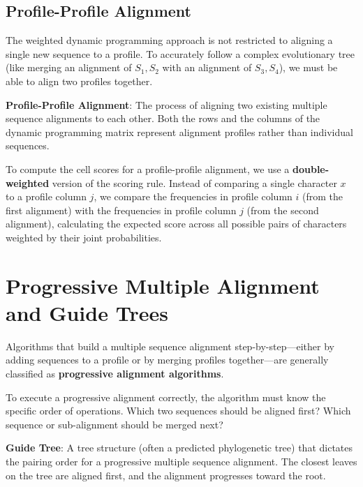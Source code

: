 \documentclass[11pt, a4paper]{article}
\newenvironment{important}
  {\begin{tcolorbox}[colback=blue!5!white, colframe=blue!75!black, arc=1mm, boxrule=1pt]}
  {\end{tcolorbox}}
\begin{document}
\subsection{Profile-Profile Alignment}

The weighted dynamic programming approach is not restricted to aligning a single new sequence to a profile. To accurately follow a complex evolutionary tree (like merging an alignment of $S_1, S_2$ with an alignment of $S_3, S_4$), we must be able to align two profiles together.

\begin{important}
  \textbf{Profile-Profile Alignment}: The process of aligning two existing multiple sequence alignments to each other. Both the rows and the columns of the dynamic programming matrix represent alignment profiles rather than individual sequences.
\end{important}

To compute the cell scores for a profile-profile alignment, we use a \textbf{double-weighted} version of the scoring rule. Instead of comparing a single character $x$ to a profile column $j$, we compare the frequencies in profile column $i$ (from the first alignment) with the frequencies in profile column $j$ (from the second alignment), calculating the expected score across all possible pairs of characters weighted by their joint probabilities.

\section{Progressive Multiple Alignment and Guide Trees}

Algorithms that build a multiple sequence alignment step-by-step—either by adding sequences to a profile or by merging profiles together—are generally classified as \textbf{progressive alignment algorithms}. 

To execute a progressive alignment correctly, the algorithm must know the specific order of operations. Which two sequences should be aligned first? Which sequence or sub-alignment should be merged next?

\begin{important}
  \textbf{Guide Tree}: A tree structure (often a predicted phylogenetic tree) that dictates the pairing order for a progressive multiple sequence alignment. The closest leaves on the tree are aligned first, and the alignment progresses toward the root.
\end{important}
\end{document}
